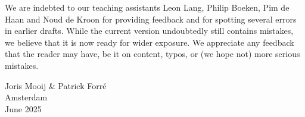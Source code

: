 We are indebted to our teaching assistants Leon Lang, Philip Boeken, Pim de Haan and Noud de Kroon for providing feedback and for spotting several errors in earlier drafts.
While the current version undoubtedly still contains mistakes, we believe that it is now ready for wider exposure. 
We appreciate any feedback that the reader may have, be it on content, typos, or (we hope not) more serious mistakes.


\bigskip
\bigskip
{\flushright Joris Mooij \& Patrick Forr\'e\\
Amsterdam\\
June 2025\\
}
